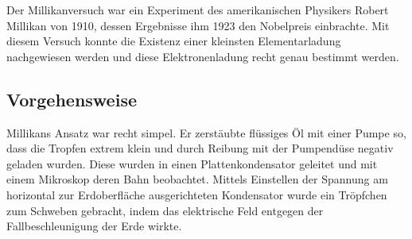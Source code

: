 




%
%	






Der Millikanversuch war ein Experiment des amerikanischen Physikers Robert Millikan von 1910, dessen Ergebnisse ihm 1923 den Nobelpreis einbrachte. Mit diesem Versuch konnte die Existenz einer kleinsten Elementarladung nachgewiesen werden und diese Elektronenladung recht genau bestimmt werden.

\subsection{Vorgehensweise}

Millikans Ansatz war recht simpel. Er zerstäubte flüssiges Öl mit einer Pumpe so, dass die Tropfen extrem klein und durch Reibung mit der Pumpendüse negativ geladen wurden. Diese wurden in einen Plattenkondensator geleitet und mit einem Mikroskop deren Bahn beobachtet. Mittels Einstellen der Spannung am horizontal zur Erdoberfläche ausgerichteten Kondensator wurde ein Tröpfchen zum Schweben gebracht, indem das elektrische Feld entgegen der Fallbeschleunigung der Erde wirkte.


